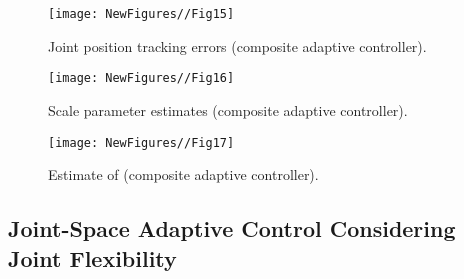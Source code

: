 \documentclass[9pt,technote]{IEEEtran}
\begin{document}
{\begin{figure}
\centering
\begin{minipage}[t]{1.0\linewidth}
\centering
\texttt{[image: NewFigures//Fig15]}
\caption{Joint position tracking errors (composite adaptive controller).}\label{fig:side:a}
\end{minipage}\end{figure}

\begin{figure}
\centering
\begin{minipage}[t]{1.0\linewidth}
\centering
\texttt{[image: NewFigures//Fig16]}
\caption{Scale parameter estimates (composite adaptive controller).}\label{fig:side:a}
\end{minipage}\end{figure}

\begin{figure}
\centering
\begin{minipage}[t]{1.0\linewidth}
\centering
\texttt{[image: NewFigures//Fig17]}
\caption{Estimate of  (composite adaptive controller).}\label{fig:side:a}
\end{minipage}\end{figure}


\subsection{Joint-Space Adaptive Control Considering Joint Flexibility}

}
\end{document}
